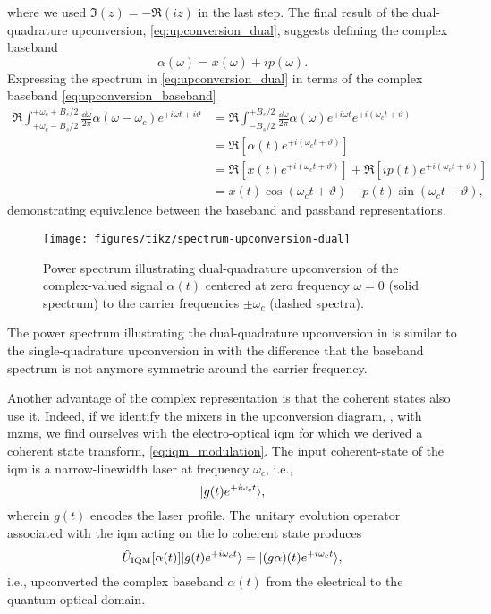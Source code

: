 where we used $\Im(z)=-\Re(iz)$ in the last step.
The final result of the dual-quadrature upconversion, \cref{eq:upconversion_dual}, suggests defining the complex baseband
\begin{equation}
	\alpha(\omega)
	=
	x(\omega)
	+
	ip(\omega)
	\label{eq:upconversion_baseband}
	.
\end{equation}
Expressing the spectrum in \cref{eq:upconversion_dual} in terms of the complex baseband \cref{eq:upconversion_baseband}
\begin{equation}
	\begin{split}
		\Re
		\int_{+\omega_c-B_s/2}^{+\omega_c+B_s/2}
		\frac{\dd{\omega}}{2\pi}
		\alpha(\omega-\omega_c)
		e^{+i\omega t+i\vartheta}
		&=
		\Re
		\int_{-B_s/2}^{+B_s/2}
		\frac{\dd{\omega}}{2\pi}
		\alpha(\omega)
		e^{+i\omega t}
		e^{+i(\omega_c t+\vartheta)}
		\\
		&=
		\Re
		\left[
			\alpha(t)
			e^{+i(\omega_c t+\vartheta)}
		\right]
		\\
		&=
		\Re
		\left[
			x(t)
			e^{+i(\omega_c t+\vartheta)}
		\right]
		+
		\Re
		\left[
			ip(t)
			e^{+i(\omega_c t+\vartheta)}
		\right]
		\\
		&=
		x(t)
		\cos(\omega_c t+\vartheta)
		-
		p(t)
		\sin(\omega_c t+\vartheta)
		,
	\end{split}
\end{equation}
demonstrating equivalence between the baseband and passband representations.
\begin{figure}[htb]
	\centering
	\texttt{[image: figures/tikz/spectrum-upconversion-dual]}
	\caption{Power spectrum illustrating dual-quadrature upconversion of the complex-valued signal $\alpha(t)$ centered at zero frequency $\omega=0$ (solid spectrum) to the carrier frequencies $\pm\omega_c$ (dashed spectra).}\label{fig:spectrum_upconversion_dual}
\end{figure}
The power spectrum illustrating the dual-quadrature upconversion in  is similar to the single-quadrature upconversion in  with the difference that the baseband spectrum is not anymore symmetric around the carrier frequency.

Another advantage of the complex representation is that the coherent states also use it.
Indeed, if we identify the mixers in the upconversion diagram, , with \glspl{mzm}, we find ourselves with the electro-optical \gls{iqm} for which we derived a coherent state transform, \cref{eq:iqm_modulation}.
The input coherent-state of the \gls{iqm} is a narrow-linewidth laser at frequency $\omega_c$, i.e.,
\begin{equation}
	\lvert g(t)e^{+i\omega_ct}\rangle
	,
\end{equation}
wherein $g(t)$ encodes the laser profile.
The unitary evolution operator associated with the \gls{iqm} acting on the \gls{lo} coherent state produces
\begin{equation}
	\hat{U}_\text{IQM}[\alpha(t)]
	\lvert g(t)e^{+i\omega_ct}\rangle
	=
	\lvert(g\alpha)(t)e^{+i\omega_ct}\rangle
	,
\end{equation}
i.e., upconverted the complex baseband $\alpha(t)$ from the electrical to the quantum-optical domain.